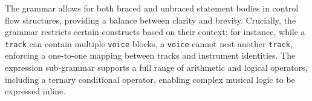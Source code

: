 The grammar allows for both braced and unbraced statement bodies in control flow structures, providing a
balance between clarity and brevity.
Crucially, the grammar restricts certain constructs based on their context; for instance, while a
\texttt{track} can contain multiple \texttt{voice} blocks, a \texttt{voice} cannot nest another
\texttt{track}, enforcing a one-to-one mapping between tracks and instrument identities.
The expression sub-grammar supports a full range of arithmetic and logical operators, including a ternary
conditional operator, enabling complex musical logic to be expressed inline.
